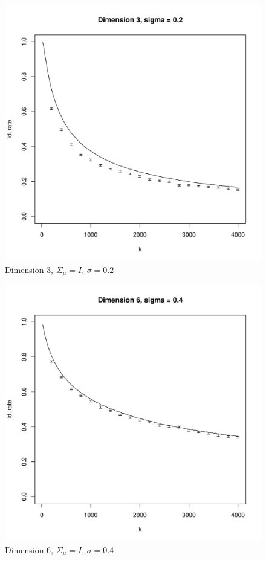 \documentclass[11pt]{article}
\begin{document}
\newpage

\begin{figure}
\centering
\includegraphics[scale = 0.6]{plot1_3.pdf}
\caption{Dimension 3, $\Sigma_\mu = I$,  $\sigma = 0.2$}
\end{figure}

\begin{figure}
\centering
\includegraphics[scale = 0.6]{plot1_6.pdf}
\caption{Dimension 6, $\Sigma_\mu = I$, $\sigma = 0.4$}
\end{figure}
\end{document}
